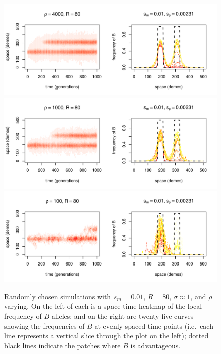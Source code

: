 \documentclass{article}
\begin{document}
\begin{figure}
  \begin{center}
    \includegraphics{example-migration-sims/42080-r1-501-sb0_01-sm-0_01-N4000-pophistory-run}
    \includegraphics{example-migration-sims/82698-r1-501-sb0_01-sm-0_01-N1000-pophistory-run}
    \includegraphics{example-migration-sims/97545-r1-501-sb0_01-sm-0_01-N100-pophistory-run}
  \end{center}
  \caption{
    Randomly chosen simulations with $s_m=0.01$, $R=80$, $\sigma\approx 1$, and $\rho$ varying.
    On the left of each is a space-time heatmap of the local frequency of $B$ alleles;
    and on the right are twenty-five curves showing the frequencies of $B$ at evenly spaced time points
    (i.e.\ each line represents a vertical slice through the plot on the left);
    dotted black lines indicate the patches where $B$ is advantageous.
  } \label{sfig:sims_6}
\end{figure}
\end{document}

